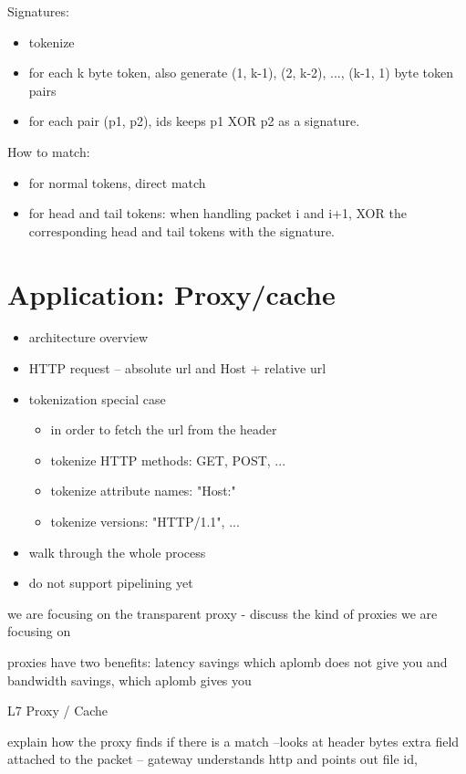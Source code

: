 Signatures:
\begin{itemize}
\item tokenize
\item for each k byte token, also generate (1, k-1), (2, k-2), ..., (k-1, 1) byte token pairs
\item for each pair (p1, p2), ids keeps p1 XOR p2 as a signature.
\end{itemize}

How to match:
\begin{itemize}
\item for normal tokens, direct match
\item for head and tail tokens: when handling packet i and i+1, XOR the corresponding head and tail tokens with the signature.
\end{itemize}

\section{Application: Proxy/cache}\label{sec:proxy}
\begin{itemize}
\item architecture overview
\item HTTP request -- absolute url and Host + relative url
\item tokenization special case \\
    \begin{itemize}
    \item in order to fetch the url from the header
    \item tokenize HTTP methods: GET, POST, ...
    \item tokenize attribute names: "Host:"
    \item tokenize versions: "HTTP/1.1", ...
    \end{itemize}
\item walk through the whole process
\item do not support pipelining yet
\end{itemize}


we are focusing on the transparent proxy
- discuss the kind of proxies we are focusing on

proxies have two benefits: latency savings which aplomb does not give you 
and bandwidth savings, which aplomb gives you
 
L7 Proxy / Cache

explain how the proxy finds if there is  a match --looks at header bytes
extra field attached to the packet -- gateway understands http and points out file id, 

